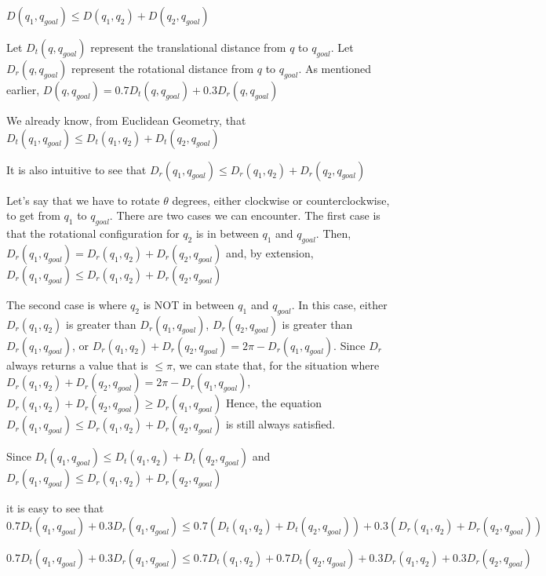 \documentclass{article}
\begin{document}
$D(q_1, q_{goal}) \leq D(q_1, q_2) + D(q_2, q_{goal})$ \newline 

Let $D_t(q, q_{goal})$ represent the translational distance from $q$ to $q_{goal}$. Let $D_r(q, q_{goal})$ represent the rotational distance from $q$ to $q_{goal}$. As mentioned earlier, $D(q, q_{goal}) = 0.7D_t(q, q_{goal}) + 0.3D_r(q, q_{goal})$ \newline 

We already know, from Euclidean Geometry, that $D_t(q_1, q_{goal}) \leq D_t(q_1, q_2) + D_t(q_2, q_{goal})$ \newline 


It is also intuitive to see that 
$D_r(q_1, q_{goal}) \leq D_r(q_1, q_2) + D_r(q_2, q_{goal})$ \newline 

Let's say that we have to rotate $\theta$ degrees, either clockwise or counterclockwise, to get from $q_1$ to $q_{goal}$. There are two cases we can encounter. The first case is that the rotational configuration for $q_2$ is in between $q_1$ and $q_{goal}$. Then,  $D_r(q_1, q_{goal}) = D_r(q_1, q_2) + D_r(q_2, q_{goal})$ and, by extension, $D_r(q_1, q_{goal}) \leq D_r(q_1, q_2) + D_r(q_2, q_{goal})$ \newline 


The second case is where $q_{2}$ is NOT in between $q_{1}$ and $q_{goal}$. In this case, either $D_r(q_1, q_2)$ is greater than $D_r(q_1, q_{goal})$, $D_r(q_2, q_{goal})$ is greater than $D_r(q_1, q_{goal})$, or $D_r(q_1, q_2) + D_r(q_2, q_{goal}) = 2\pi - D_r(q_1, q_{goal})$. Since $D_r$ always returns a value that is $\leq \pi$, we can state that, for the situation where $D_r(q_1, q_2) + D_r(q_2, q_{goal}) = 2\pi - D_r(q_1, q_{goal})$, $D_r(q_1, q_2) + D_r(q_2, q_{goal}) \geq D_r(q_1, q_{goal})$  Hence, the equation $D_r(q_1, q_{goal}) \leq D_r(q_1, q_2) + D_r(q_2, q_{goal})$ is still always satisfied. \newline 

Since $D_t(q_1, q_{goal}) \leq D_t(q_1, q_2) + D_t(q_2, q_{goal})$ and $D_r(q_1, q_{goal}) \leq D_r(q_1, q_2) + D_r(q_2, q_{goal})$ \newline 

it is easy to see that $0.7 D_t(q_1, q_{goal}) + 0.3 D_r(q_1, q_{goal}) \leq 0.7(D_t(q_1, q_2) + D_t(q_2, q_{goal})) + 0.3(D_r(q_1, q_2) + D_r(q_2, q_{goal}))$ \newline 

$0.7 D_t(q_1, q_{goal}) + 0.3 D_r(q_1, q_{goal}) \leq 0.7D_t(q_1, q_2) + 0.7D_t(q_2, q_{goal}) + 0.3D_r(q_1, q_2) + 0.3D_r(q_2, q_{goal})$ \newline 
\end{document}
